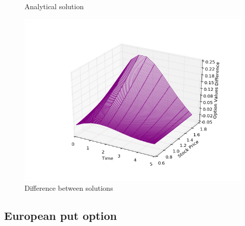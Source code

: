\documentclass[11pt,a4paper]{extarticle}
\begin{document}
\begin{minipage}{\linewidth}
\begin{minipage}{0.29\linewidth}
\begin{figure}[H]
              \caption{Analytical solution}
          \end{figure}
      \end{minipage}
      \hspace{0.04\linewidth}
      \begin{minipage}{0.29\linewidth}
          \begin{figure}[H]
              \includegraphics[width=\linewidth]{Figures/eu-call-dif}
              \caption{Difference between solutions}
          \end{figure}
      \end{minipage}
\end{minipage}

\subsection{European put option}
\end{document}
